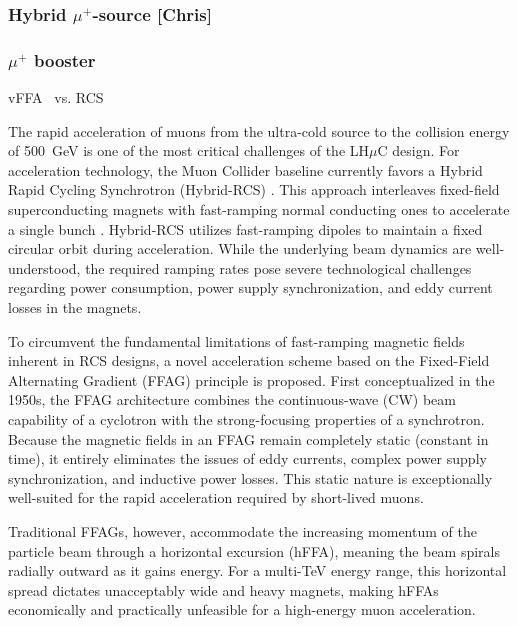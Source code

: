 \documentclass[a4paper,11pt]{article}
\newcommand{\lhuc}{LH\ensuremath{\mu}C\xspace}
\begin{document}
\subsubsection{Hybrid \texorpdfstring{$\mu^+$}{muon}-source [Chris]}

\subsubsection{\texorpdfstring{$\mu^+$}{Muon} booster}

vFFA~\cite{max} vs. RCS~\cite{InternationalMuonCollider:2025sys} 


The rapid acceleration of muons from the ultra-cold source to the collision energy of 500~GeV is one of the most critical challenges of the \lhuc design. For acceleration technology, the Muon Collider baseline currently favors a Hybrid Rapid Cycling Synchrotron (Hybrid-RCS) \cite{taylor2025mucol}. This approach interleaves fixed-field superconducting magnets with fast-ramping normal conducting ones to accelerate a single bunch \cite{black2024muon}. Hybrid-RCS utilizes fast-ramping dipoles to maintain a fixed circular orbit during acceleration. While the underlying beam dynamics are well-understood, the required ramping rates pose severe technological challenges regarding power consumption, power supply synchronization, and eddy current losses in the magnets.

 

To circumvent the fundamental limitations of fast-ramping magnetic fields inherent in RCS designs, a novel acceleration scheme based on the Fixed-Field Alternating Gradient (FFAG) principle is proposed. First conceptualized in the 1950s, the FFAG architecture combines the continuous-wave (CW) beam capability of a cyclotron with the strong-focusing properties of a synchrotron. Because the magnetic fields in an FFAG remain completely static (constant in time), it entirely eliminates the issues of eddy currents, complex power supply synchronization, and inductive power losses. This static nature is exceptionally well-suited for the rapid acceleration required by short-lived muons.

Traditional FFAGs, however, accommodate the increasing momentum of the particle beam through a horizontal excursion (hFFA), meaning the beam spirals radially outward as it gains energy. For a multi-TeV energy range, this horizontal spread dictates unacceptably wide and heavy magnets, making hFFAs economically and practically unfeasible for a high-energy muon acceleration.
\end{document}
